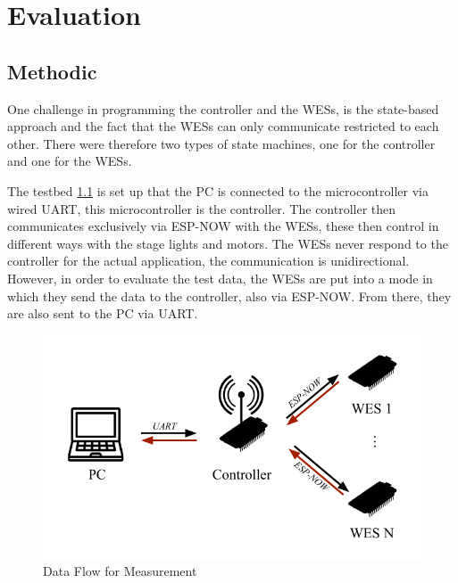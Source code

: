 
\chapter{Evaluation}
\label{sec:evaluation}

\section{Methodic}
One challenge in programming the controller and the WESs,
is the state-based approach and the fact that the WESs can only communicate restricted to each other.
There were therefore two types of state machines, one for the controller and one for the WESs.

The testbed \cref{fig:testbed} is set up that the PC is connected to the microcontroller via wired \ac{UART}, this microcontroller is the controller.
The controller then communicates exclusively via ESP-NOW with the WESs,
these then control in different ways with the stage lights and motors.
The WESs never respond to the controller for the actual application, the communication is unidirectional.
However, in order to evaluate the test data, the WESs are put into a mode in which they send the data to the controller, also via ESP-NOW.
From there, they are also sent to the PC via UART.

\begin{figure}[h]
	\centering
	\includegraphics[scale=0.75]{figures/TestFlow.pdf}
	\caption{Data Flow for Measurement}
	\label{fig:testbed}
\end{figure}

